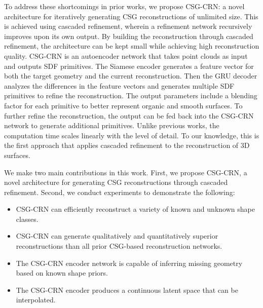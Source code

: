 To address these shortcomings in prior works, we propose CSG-CRN: a novel architecture for iteratively generating CSG reconstructions of unlimited size. This is achieved using cascaded refinement, wherein a refinement network recursively improves upon its own output. By building the reconstruction through cascaded refinement, the architecture can be kept small while achieving high reconstruction quality. CSG-CRN is an autoencoder network that takes point clouds as input and outputs SDF primitives. The Siamese encoder generates a feature vector for both the target geometry and the current reconstruction. Then the GRU decoder analyzes the differences in the feature vectors and generates multiple SDF primitives to refine the reconstruction. The output parameters include a blending factor for each primitive to better represent organic and smooth surfaces. To further refine the reconstruction, the output can be fed back into the CSG-CRN network to generate additional primitives. Unlike previous works, the computation time scales linearly with the level of detail. To our knowledge, this is the first approach that applies cascaded refinement to the reconstruction of 3D surfaces.

We make two main contributions in this work. First, we propose CSG-CRN, a novel architecture for generating CSG reconstructions through cascaded refinement. Second, we conduct experiments to demonstrate the following:

\begin{itemize}
	\item CSG-CRN can efficiently reconstruct a variety of known and unknown shape classes.
	\item CSG-CRN can generate qualitatively and quantitatively superior reconstructions than all prior CSG-based reconstruction networks.
	\item The CSG-CRN encoder network is capable of inferring missing geometry based on known shape priors.
	\item The CSG-CRN encoder produces a continuous latent space that can be interpolated.
\end{itemize}
